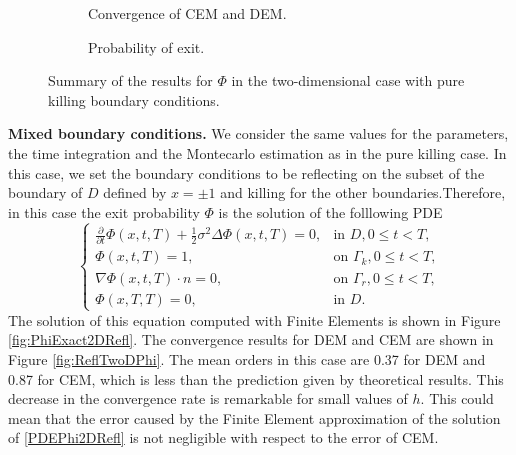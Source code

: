 \begin{figure}[t]
    \centering
    \begin{subfigure}{0.49\linewidth}
        \centering
        \resizebox{1\linewidth}{!}{ }  
        \caption{Convergence of CEM and DEM.}
        \label{fig:KillTwoDPhi}
    \end{subfigure}
    \begin{subfigure}{0.49\linewidth}
        \centering
        \resizebox{1\linewidth}{!}{ }  
        \caption{Probability of exit.}
        \label{fig:PhiExact2DKill}
    \end{subfigure}    
    \caption{Summary of the results for $\Phi$ in the two-dimensional case with pure killing boundary conditions.}
    \label{fig:OrdersTwoDKillPhi}
\end{figure}
\vspace{2mm}
\noindent\textbf{Mixed boundary conditions.} We consider the same values for the parameters, the time integration and the Montecarlo estimation as in the pure killing case. In this case, we set the boundary conditions to be reflecting on the subset of the boundary of $D$ defined by $x = \pm 1$ and killing for the other boundaries.Therefore, in this case the exit probability $\Phi$ is the solution of the folllowing PDE
\begin{equation}\label{eq:PDEPhi2DRefl}
\begin{cases}
	\frac{\partial}{\partial t} \Phi(x,t,T) + \frac{1}{2} \sigma^2 \Delta \Phi(x,t,T) = 0, & \text{in } D, 0 \leq t < T,\\
	\Phi(x,t,T) = 1, & \text{on } \Gamma_k, 0 \leq t < T,\\
	\nabla \Phi(x,t,T) \cdot n = 0, & \text{on } \Gamma_r, 0 \leq t < T,\\
	\Phi(x,T,T) = 0, & \text{in } D.
\end{cases}
\end{equation}
The solution of this equation computed with Finite Elements is shown in Figure \ref{fig:PhiExact2DRefl}. The convergence results for DEM and CEM are shown in Figure \ref{fig:ReflTwoDPhi}. The mean orders in this case are 0.37 for DEM and 0.87 for CEM, which is less than the prediction given by theoretical results. This decrease in the convergence rate is remarkable for small values of $h$. This could mean that the error caused by the Finite Element approximation of the solution of \eqref{PDEPhi2DRefl} is not negligible with respect to the error of CEM.
